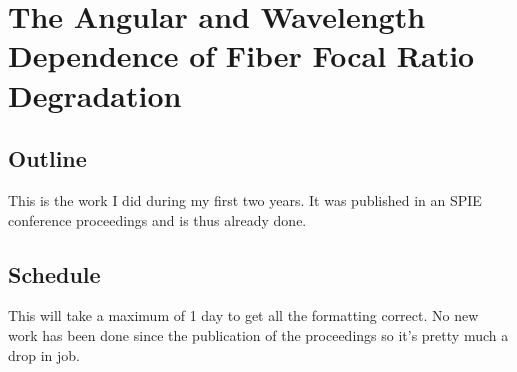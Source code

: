 \chapter[Fiber Focal Ration Degradation]{The Angular and Wavelength Dependence of Fiber Focal Ratio Degradation}
\label{chap:FRD}



\section{Outline}
This is the work I did during my first two years. It was published in an SPIE
conference proceedings and is thus already done.

\section{Schedule}
This will take a maximum of 1 day to get all the formatting correct. No new
work has been done since the publication of the proceedings so it's pretty
much a drop in job.



